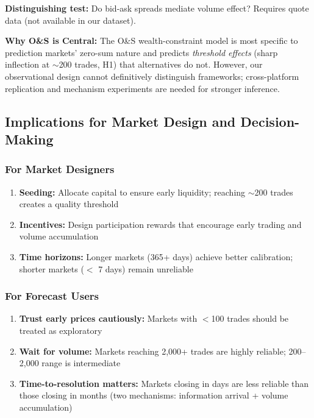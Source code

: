 \documentclass[12pt,letterpaper]{article}
\begin{document}
\textbf{Distinguishing test:} Do bid-ask spreads mediate volume effect? Requires quote data (not available in our dataset).

\textbf{Why O\&S is Central:} The O\&S wealth-constraint model is most specific to prediction markets' zero-sum nature and predicts \textit{threshold effects} (sharp inflection at $\sim$200 trades, H1) that alternatives do not. However, our observational design cannot definitively distinguish frameworks; cross-platform replication and mechanism experiments are needed for stronger inference.

\subsection{Implications for Market Design and Decision-Making}

\subsubsection{For Market Designers}
\begin{enumerate}
    \item \textbf{Seeding:} Allocate capital to ensure early liquidity; reaching $\sim$200 trades creates a quality threshold
    \item \textbf{Incentives:} Design participation rewards that encourage early trading and volume accumulation
    \item \textbf{Time horizons:} Longer markets (365+ days) achieve better calibration; shorter markets ($<$ 7 days) remain unreliable
\end{enumerate}

\subsubsection{For Forecast Users}
\begin{enumerate}
    \item \textbf{Trust early prices cautiously:} Markets with $<$100 trades should be treated as exploratory
    \item \textbf{Wait for volume:} Markets reaching 2,000+ trades are highly reliable; 200--2,000 range is intermediate
    \item \textbf{Time-to-resolution matters:} Markets closing in days are less reliable than those closing in months (two mechanisms: information arrival + volume accumulation)
\end{enumerate}
\end{document}
